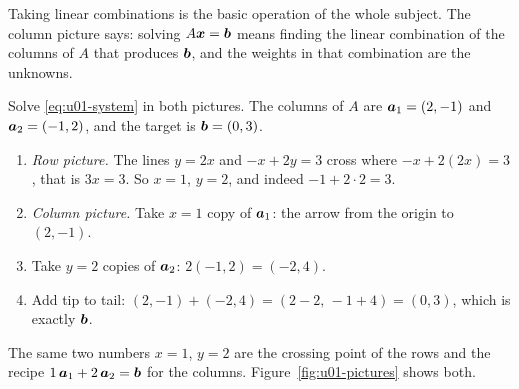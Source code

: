 Taking linear combinations is the basic operation of the whole subject. The column picture
says: solving $A\boldsymbol{x}=\boldsymbol{b}$ means finding the linear combination of the columns of $A$ that
produces $\boldsymbol{b}$, and the weights in that combination are the unknowns.

\begin{example}\label{ex:u01-two-pictures}
Solve \eqref{eq:u01-system} in both pictures. The columns of $A$ are
$\boldsymbol{a}_1=(2,-1)$ and $\boldsymbol{a}_2=(-1,2)$, and the target is $\boldsymbol{b}=(0,3)$.
\begin{enumerate}
  \item \emph{Row picture.} The lines $y=2x$ and $-x+2y=3$ cross where
    $-x+2(2x)=3$, that is $3x=3$. So $x=1$, $y=2$, and indeed $-1+2\cdot 2=3$.
  \item \emph{Column picture.} Take $x=1$ copy of $\boldsymbol{a}_1$: the arrow from the origin to
    $(2,-1)$.
  \item Take $y=2$ copies of $\boldsymbol{a}_2$: $2(-1,2)=(-2,4)$.
  \item Add tip to tail: $(2,-1)+(-2,4)=(2-2,\,-1+4)=(0,3)$, which is exactly $\boldsymbol{b}$.
\end{enumerate}
The same two numbers $x=1$, $y=2$ are the crossing point of the rows and the recipe
$1\,\boldsymbol{a}_1+2\,\boldsymbol{a}_2=\boldsymbol{b}$ for the columns. Figure~\ref{fig:u01-pictures} shows both.
\end{example}


